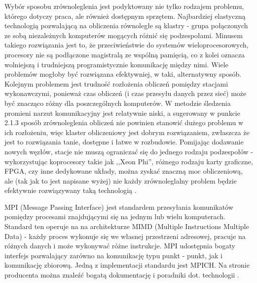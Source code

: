 Wybór sposobu zrównoleglenia jest podyktowany nie tylko rodzajem problemu, którego dotyczy praca, ale również dostępnym sprzętem. Najbardziej elastyczną technologią pozwalającą na obliczenia równoległe są klastry - grupa połączonych ze sobą niezależnych komputerów mogących różnić się podzespołami. Minusem takiego rozwiązania jest to, że przeciwieństwie do systemów wieloprocesorowych, procesory nie są podłączone magistralą ze wspólną pamięcią, co z kolei oznacza wolniejszą i trudniejszą programistycznie komunikację między nimi. Wiele problemów mogłoby być rozwiązana efektywniej, w taki, alternatywny sposób. Kolejnym problemem jest trudność rozłożenia obliczeń pomiędzy stacjami wykonawczymi, ponieważ czas obliczeń (i czas przesyłu danych przez sieć) może być znacząco różny dla poszczególnych komputerów. W metodzie śledzenia promieni narzut komunikacyjny jest relatywnie niski, a sugerowany w punkcie 2.1.3 sposób zrównoleglenia obliczeń nie powinien stanowić dużego problemu w ich rozłożeniu, więc klaster obliczeniowy jest dobrym rozwiązaniem, zwłaszcza że jest to rozwiązania tanie, dostępne i łatwe w rozbudowie. Pomijając dodawanie nowych węzłów, stacje nie muszą ograniczać się do jednego rodzaju podzespołów - wykorzystując koprocesory takie jak ,,Xeon Phi'', różnego rodzaju karty graficzne, FPGA, czy inne dedykowane układy, można zyskać znaczną moc obliczeniową, ale (tak jak to jest napisane wyżej) nie każdy zrównoleglalny problem będzie efektywnie rozwiązywany taką technologią \cite{wikiPar}. 

MPI (Message Passing Interface) jest standardem przesyłania komunikatów pomiędzy procesami znajdującymi się na jednym lub wielu komputerach. Standard ten operuje na na architekturze MIMD (Multiple Instructions Multiple Data) - każdy proces wykonuje się we własnej przestrzeni adresowej, pracuje na różnych danych i może wykonywać różne instrukcje. MPI udostępnia bogaty interfejs pozwalający zarówno na komunikację typu punkt - punkt, jak i komunikację zbiorową. Jedną z implementacji standardu jest MPICH. Na stronie producenta można znaleźć bogatą dokumentację i poradniki dot. technologii \cite{mpich}. 